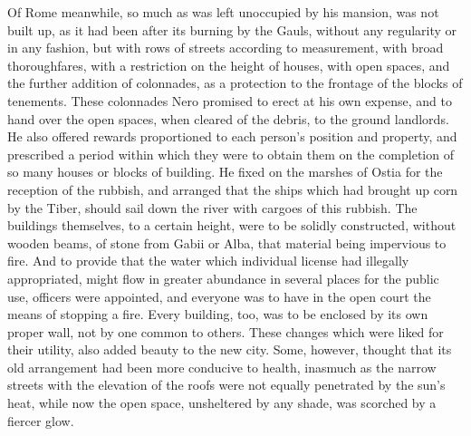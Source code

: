 
Of Rome meanwhile, so much as was left unoccupied by his mansion, was not built up, as it had been after its burning by the Gauls, without any regularity or in any fashion, but with rows of streets according to measurement, with broad thoroughfares, with a restriction on the height of houses, with open spaces, and the further addition of colonnades, as a protection to the frontage of the blocks of tenements. These colonnades Nero promised to erect at his own expense, and to hand over the open spaces, when cleared of the debris, to the ground landlords. He also offered rewards proportioned to each person's position and property, and prescribed a period within which they were to obtain them on the completion of so many houses or blocks of building. He fixed on the marshes of Ostia for the reception of the rubbish, and arranged that the ships which had brought up corn by the Tiber, should sail down the river with cargoes of this rubbish. The buildings themselves, to a certain height, were to be solidly constructed, without wooden beams, of stone from Gabii or Alba, that material being impervious to fire. And to provide that the water which individual license had illegally appropriated, might flow in greater abundance in several places for the public use, officers were appointed, and everyone was to have in the open court the means of stopping a fire. Every building, too, was to be enclosed by its own proper wall, not by one common to others. These changes which were liked for their utility, also added beauty to the new city. Some, however, thought that its old arrangement had been more conducive to health, inasmuch as the narrow streets with the elevation of the roofs were not equally penetrated by the sun's heat, while now the open space, unsheltered by any shade, was scorched by a fiercer glow.


